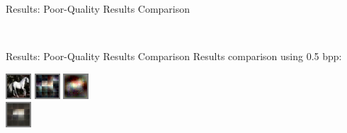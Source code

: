 \documentclass[10pt]{beamer}
\begin{document}
\begin{frame}{Results: Poor-Quality Results Comparison}
\begin{center}
    \end{center}
    \begin{figure}
      \begin{minipage}{\textwidth}
               \\
      \end{minipage}
  \end{figure}
  \end{frame}

  \begin{frame}{Results: Poor-Quality Results Comparison}
    Results comparison using 0.5 bpp:
    \begin{center}
      \includegraphics[width=0.3\linewidth]{./img/decoded_imgs/horse.png}
      \includegraphics[width=0.3\linewidth]{./img/decoded_imgs/horse_FC_64B.png}
      \includegraphics[width=0.3\linewidth]{./img/decoded_imgs/horse_ConvRes_p32_b64-p8.png}\\
      \includegraphics[width=0.3\linewidth]{./img/decoded_imgs/horse_LSTM.png}

\end{center}
\end{frame}
\end{document}
